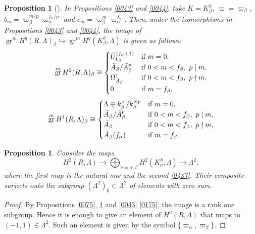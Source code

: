 \documentclass{amsart}
\newtheorem{Prop}[Thm]{Proposition}
\theoremstyle{remark}
\numberwithin{equation}{subsection}
\newcommand{\into}{\hookrightarrow}
\DeclareMathOperator{\gr}{gr}
\begin{document}
\begin{Prop}[{\cite[(4.11)]{Sai86}}] \label{0076}
	In Propositions \ref{0043}
	and \ref{0044},
	take $K = K_{\beta}^{h}$, $\varpi = \varpi_{\beta}$,
	$b_{m} = \varpi_{\beta}^{m / p} \varpi_{\alpha}^{f_{\alpha} / p}$ and
	$c_{m} = \varpi_{\beta}^{m} \varpi_{\alpha}^{f_{\alpha}}$.
	Then, under the isomorphisms in
	Propositions \ref{0043}
	and \ref{0044},
	the image of $\gr^{m} H^{q}(R, \Lambda)_{\beta} \into \gr^{m} H^{q}(K_{\beta}^{h}, \Lambda)$
	is given as follows:
		\[
				\gr^{m} H^{2}(R, \Lambda)_{\beta}
			\cong
				\begin{cases}
							\Tilde{U}_{k_{\beta}}^{(f_{\alpha} + 1)}
					&	\text{if }
							m = 0,
					\\
							\Bar{A}_{\beta} / \Bar{A}_{\beta}^{p}
					&	\text{if }
							0 < m < f_{\beta},\ p \mid m,
					\\
							\Omega_{\Bar{A}_{\beta}}^{1}
					&	\text{if }
							0 < m < f_{\beta},\ p \nmid m,
					\\
							0
					&	\text{if }
							m = f_{\beta},
				\end{cases}
		\]
		\[
				\gr^{m} H^{1}(R, \Lambda)_{\beta}
			\cong
				\begin{cases}
							\Lambda \oplus k_{\beta}^{\times} / k_{\beta}^{\times p}
					&	\text{if }
							m = 0,
					\\
							\Bar{A}_{\beta} / \Bar{A}_{\beta}^{p}
					&	\text{if }
							0 < m < f_{\beta},\ p \mid m,
					\\
							\Bar{A}_{\beta}
					&	\text{if }
							0 < m < f_{\beta},\ p \nmid m,
					\\
							\Tilde{A}_{\beta}(f_{\alpha})
					&	\text{if }
							m = f_{\beta}.
				\end{cases}
		\]
\end{Prop}

\begin{Prop} \label{0504}
	Consider the maps
		\[
				H^{2}(R, \Lambda)
			\to
				\bigoplus_{\nu = \alpha, \beta}
					H^{2}(K_{\nu}^{h}, \Lambda)
			\to
				\Lambda^{2},
		\]
	where the first map is the natural one and the second \eqref{0437}.
	Their composite surjects onto the subgroup
	$(\Lambda^{2})_{0} \subset \Lambda^{2}$ of elements with zero sum.
\end{Prop}

\begin{proof}
	By Propositions \ref{0075}, \ref{0076} and \ref{0043} \eqref{0175},
	the image is a rank one subgroup.
	Hence it is enough to give an element of $H^{2}(R, \Lambda)$
	that maps to $(- 1, 1) \in \Lambda^{2}$.
	Such an element is given by the symbol $\{\varpi_{\alpha}, \varpi_{\beta}\}$.
\end{proof}
\end{document}
